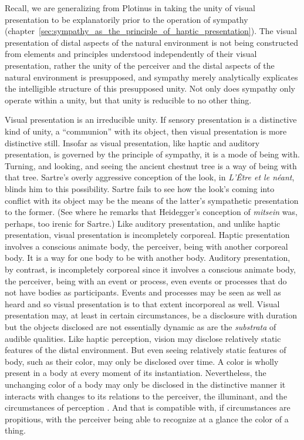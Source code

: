 Recall, we are generalizing from Plotinus in taking the unity of visual presentation to be explanatorily prior to the operation of sympathy (chapter~\ref{sec:sympathy_as_the_principle_of_haptic_presentation}). The visual presentation of distal aspects of the natural environment is not being constructed from elements and principles understood independently of their visual presentation, rather the unity of the perceiver and the distal aspects of the natural environment is presupposed, and sympathy merely analytically explicates the intelligible structure of this presupposed unity. Not only does sympathy only operate within a unity, but that unity is reducible to no other thing.

Visual presentation is an irreducible unity. If sensory presentation is a distinctive kind of unity, a ``communion'' with its object, then visual presentation is more distinctive still. Insofar as visual presentation, like haptic and auditory presentation, is governed by the principle of sympathy, it is a mode of being with. Turning, and looking, and seeing the ancient chestnut tree is a way of being with that tree. Sartre's overly aggressive conception of the look, in \emph{L'Être et le néant}, blinds him to this possibility. Sartre fails to see how the look's coming into conflict with its object may be the means of the latter's sympathetic presentation to the former. (See \citealt[chapter 5, especially 287]{Jay:1994aa} where he remarks that Heidegger's conception of \emph{mitsein} was, perhaps, too irenic for Sartre.) Like auditory presentation, and unlike haptic presentation, visual presentation is incompletely corporeal. Haptic presentation involves a conscious animate body, the perceiver, being with another corporeal body. It is a way for one body to be with another body. Auditory presentation, by contrast, is incompletely corporeal since it involves a conscious animate body, the perceiver, being with an event or process, even events or processes that do not have bodies as participants. Events and processes may be seen as well as heard and so visual presentation is to that extent incorporeal as well. Visual presentation may, at least in certain circumstances, be a disclosure with duration but the objects disclosed are not essentially dynamic as are the \emph{substrata} of audible qualities. Like haptic perception, vision may disclose relatively static features of the distal environment. But even seeing relatively static features of body, such as their color, may only be disclosed over time. A color is wholly present in a body at every moment of its instantiation. Nevertheless, the unchanging color of a body may only be disclosed in the distinctive manner it interacts with changes to its relations to the perceiver, the illuminant, and the circumstances of perception \citep{Broackes:1997pa,Noe:2004fk,Matthen:2005md}. And that is compatible with, if circumstances are propitious, with the perceiver being able to recognize at a glance the color of a thing.

